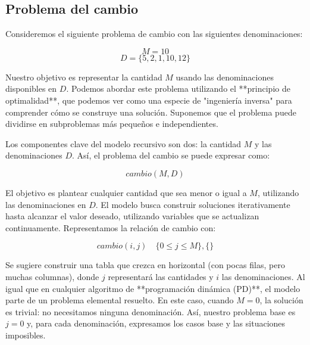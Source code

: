 \documentclass[tikz,11pt,fleqn]{book} %
\begin{document}


\subsection{Problema del cambio}

Consideremos el siguiente problema de cambio con las siguientes denominaciones:

$$
M = 10
$$
$$
D = \{5, 2, 1, 10, 12\}
$$

Nuestro objetivo es representar la cantidad $M$ usando las denominaciones disponibles en $D$. Podemos abordar este problema utilizando el **principio de optimalidad**, que podemos ver como una especie de "ingeniería inversa" para comprender cómo se construye una solución. Suponemos que el problema puede dividirse en subproblemas más pequeños e independientes.

Los componentes clave del modelo recursivo son dos: la cantidad $M$ y las denominaciones $D$. Así, el problema del cambio se puede expresar como:

$$
cambio(M, D)
$$

El objetivo es plantear cualquier cantidad que sea menor o igual a $M$, utilizando las denominaciones en $D$. El modelo busca construir soluciones iterativamente hasta alcanzar el valor deseado, utilizando variables que se actualizan continuamente. Representamos la relación de cambio con:

$$
cambio(i, j) \quad \{0 \leq j \leq M\}, \{\}
$$

Se sugiere construir una tabla que crezca en horizontal (con pocas filas, pero muchas columnas), donde $j$ representará las cantidades y $i$ las denominaciones. Al igual que en cualquier algoritmo de **programación dinámica (PD)**, el modelo parte de un problema elemental resuelto. En este caso, cuando $M=0$, la solución es trivial: no necesitamos ninguna denominación. Así, nuestro problema base es $j = 0$ y, para cada denominación, expresamos los casos base y las situaciones imposibles.
\end{document}
